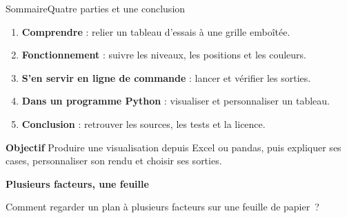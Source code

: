 \begin{frame}[t]{Sommaire}{Quatre parties et une conclusion}
\vfill
{
\begin{enumerate}\itemsep7pt
\item \textbf{Comprendre} : relier un tableau d'essais à une grille emboîtée.
\item \textbf{Fonctionnement} : suivre les niveaux, les positions et les couleurs.
\item \textbf{S'en servir en ligne de commande} : lancer et vérifier les sorties.
\item \textbf{Dans un programme Python} : visualiser et personnaliser un tableau.
\item \textbf{Conclusion} : retrouver les sources, les tests et la licence.
\end{enumerate}
\vspace{0.6em}
\begin{mybox3}{\textbf{Objectif}}
Produire une visualisation depuis Excel ou pandas, puis expliquer ses cases, personnaliser son rendu et choisir ses sorties.
\end{mybox3}}
\vfill
\end{frame}

\begin{frame}[plain]
\centering\vspace{1cm}
\textbf{\Huge Plusieurs facteurs, une feuille}
\vspace{1cm}

{\large Comment regarder un plan à plusieurs facteurs sur une feuille de papier~?}
\end{frame}
